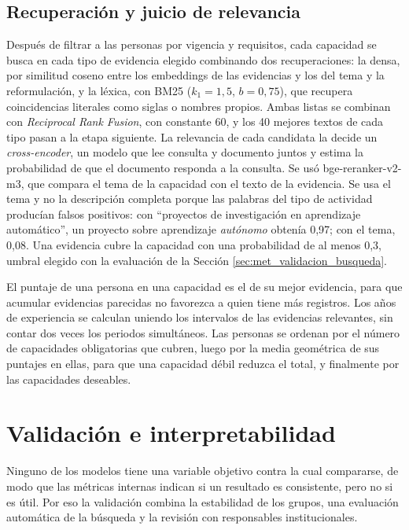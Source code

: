 \subsection{Recuperación y juicio de relevancia}

Después de filtrar a las personas por vigencia y requisitos, cada capacidad se busca en cada tipo de evidencia elegido combinando dos recuperaciones: la densa, por similitud coseno entre los embeddings de las evidencias y los del tema y la reformulación, y la léxica, con BM25 ($k_1 = 1{,}5$, $b = 0{,}75$), que recupera coincidencias literales como siglas o nombres propios. Ambas listas se combinan con \textit{Reciprocal Rank Fusion}, con constante 60, y los 40 mejores textos de cada tipo pasan a la etapa siguiente.
La relevancia de cada candidata la decide un \textit{cross-encoder}, un modelo que lee consulta y documento juntos y estima la probabilidad de que el documento responda a la consulta. Se usó bge-reranker-v2-m3, que compara el tema de la capacidad con el texto de la evidencia. Se usa el tema y no la descripción completa porque las palabras del tipo de actividad producían falsos positivos: con ``proyectos de investigación en aprendizaje automático'', un proyecto sobre aprendizaje \textit{autónomo} obtenía 0,97; con el tema, 0,08. Una evidencia cubre la capacidad con una probabilidad de al menos 0,3, umbral elegido con la evaluación de la Sección \ref{sec:met_validacion_busqueda}.

El puntaje de una persona en una capacidad es el de su mejor evidencia, para que acumular evidencias parecidas no favorezca a quien tiene más registros. Los años de experiencia se calculan uniendo los intervalos de las evidencias relevantes, sin contar dos veces los periodos simultáneos. Las personas se ordenan por el número de capacidades obligatorias que cubren, luego por la media geométrica de sus puntajes en ellas, para que una capacidad débil reduzca el total, y finalmente por las capacidades deseables.

\section{Validación e interpretabilidad}
\label{sec:met_validacion}

Ninguno de los modelos tiene una variable objetivo contra la cual compararse, de modo que las métricas internas indican si un resultado es consistente, pero no si es útil. Por eso la validación combina la estabilidad de los grupos, una evaluación automática de la búsqueda y la revisión con responsables institucionales.

